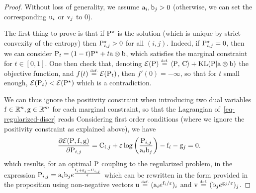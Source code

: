 \begin{proof} 
Without loss of generality, we assume $\a_i,\b_j>0$ (otherwise, we can set the corresponding $\uD_i$ or $\vD_j$ to 0).

The first thing to prove is that if $\P^\star$ is the solution (which is unique by strict convexity of the entropy) then $\P_{i,j}^\star>0$ for all $(i,j)$. Indeed, if $\P_{i,j}^\star=0$, then we can consider $\P_t = (1-t)\P^\star + t \a \otimes \b$, which satisfies the marginal constraint for $t \in [0,1]$. One then check that, denoting $\Ee(\P) \eqdef \dotp{\P}{\C}+\KLD(\P|\a \otimes \b)$ the objective function, and $f(t) \eqdef \Ee(\P_t)$, then $f'(0) = -\infty$, so that for $t$ small enough, $\Ee(\P_t)<\Ee(\P^\star)$ which is a contradiction.

We can thus ignore the positivity constraint when introducing two dual variables $\fD\in\RR^n,\gD\in\RR^m$ for each marginal constraint, so that the Lagrangian of~\eqref{eq-regularized-discr} reads
Considering first order conditions (where we ignore the positivity constraint as explained above), we have
$$
	\frac{\partial\Lag(\P,\fD,\gD)}{\partial \P_{i,j}}= \C_{i,j} + \epsilon \log\pa{\frac{\P_{i,j}}{\a_i \b_j}} - \fD_i -\gD_j = 0.
$$
which results, for an optimal $\P$ coupling to the regularized problem, in the expression 
$\P_{i,j}=\a_i \b_j e^{\frac{\fD_i+\gD_j - \C_{i,j}}{\epsilon}}$ 
which can be rewritten in the form provided in the proposition using non-negative vectors $\uD \eqdef (\a_i e^{\fD_i/\varepsilon})_i$ and $\vD \eqdef (\b_j e^{\gD_j/\varepsilon})_j$.
\end{proof} 

